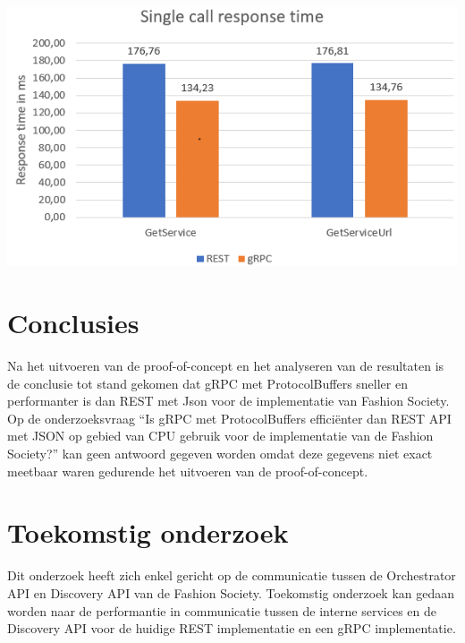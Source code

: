 \documentclass[a0,portrait]{a0poster}
\begin{document}
\begin{multicols}{2}
\begin{center}\vspace{1cm}
	\includegraphics[width=1.0\linewidth]{singleCall}
\end{center}\vspace{1cm}





\color{HoGentAccent1} 
\section*{Conclusies}
\color{black}
Na het uitvoeren van de proof-of-concept en het analyseren van de resultaten is de conclusie tot stand gekomen dat gRPC met ProtocolBuffers sneller en performanter is dan REST met Json voor de implementatie van Fashion Society. Op de onderzoeksvraag “Is gRPC met ProtocolBuffers efficiënter dan REST API met JSON op gebied van CPU gebruik voor de implementatie van de Fashion Society?” kan geen antwoord gegeven worden omdat deze gegevens niet exact meetbaar waren gedurende het uitvoeren van de proof-of-concept.
\color{HoGentAccent1} 
\section*{Toekomstig onderzoek}
\color{black}

Dit onderzoek heeft zich enkel gericht op de communicatie tussen de Orchestrator API en Discovery API van de Fashion Society. Toekomstig onderzoek kan gedaan worden naar de performantie in communicatie tussen de interne services en de Discovery API voor de huidige REST implementatie en een gRPC implementatie.


\end{multicols}
\end{document}
